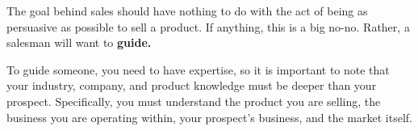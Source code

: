 The goal behind sales should have nothing to do with the act of being as persuasive as possible to sell a product. If anything, this is a big no-no. Rather, a salesman will want to \textbf{guide. }

To guide someone, you need to have expertise, so it is important to note that your industry, company, and product knowledge must be deeper than your prospect. Specifically, you must understand the product you are selling, the business you are operating within, your prospect's business, and the market itself.